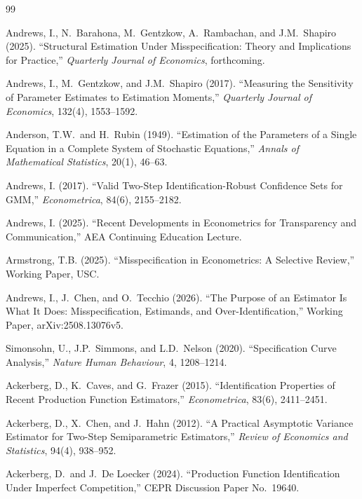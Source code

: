 \documentclass[11pt]{article}
\begin{document}
\newpage
\begingroup
\small
\begin{thebibliography}{99}

 Andrews, I., N.~Barahona, M.~Gentzkow, A.~Rambachan, and J.M.~Shapiro (2025). ``Structural Estimation Under Misspecification: Theory and Implications for Practice,'' \emph{Quarterly Journal of Economics}, forthcoming.

 Andrews, I., M.~Gentzkow, and J.M.~Shapiro (2017). ``Measuring the Sensitivity of Parameter Estimates to Estimation Moments,'' \emph{Quarterly Journal of Economics}, 132(4), 1553--1592.

 Anderson, T.W.\ and H.~Rubin (1949). ``Estimation of the Parameters of a Single Equation in a Complete System of Stochastic Equations,'' \emph{Annals of Mathematical Statistics}, 20(1), 46--63.

 Andrews, I. (2017). ``Valid Two-Step Identification-Robust Confidence Sets for GMM,'' \emph{Econometrica}, 84(6), 2155--2182.

 Andrews, I. (2025). ``Recent Developments in Econometrics for Transparency and Communication,'' AEA Continuing Education Lecture.

 Armstrong, T.B. (2025). ``Misspecification in Econometrics: A Selective Review,'' Working Paper, USC.

 Andrews, I., J.~Chen, and O.~Tecchio (2026). ``The Purpose of an Estimator Is What It Does: Misspecification, Estimands, and Over-Identification,'' Working Paper, arXiv:2508.13076v5.

 Simonsohn, U., J.P.\ Simmons, and L.D.\ Nelson (2020). ``Specification Curve Analysis,'' \emph{Nature Human Behaviour}, 4, 1208--1214.

 Ackerberg, D., K.~Caves, and G.~Frazer (2015). ``Identification Properties of Recent Production Function Estimators,'' \emph{Econometrica}, 83(6), 2411--2451.

 Ackerberg, D., X.~Chen, and J.~Hahn (2012). ``A Practical Asymptotic Variance Estimator for Two-Step Semiparametric Estimators,'' \emph{Review of Economics and Statistics}, 94(4), 938--952.

 Ackerberg, D.\ and J.~De Loecker (2024). ``Production Function Identification Under Imperfect Competition,'' CEPR Discussion Paper No.~19640.


\end{thebibliography}
\end{document}
